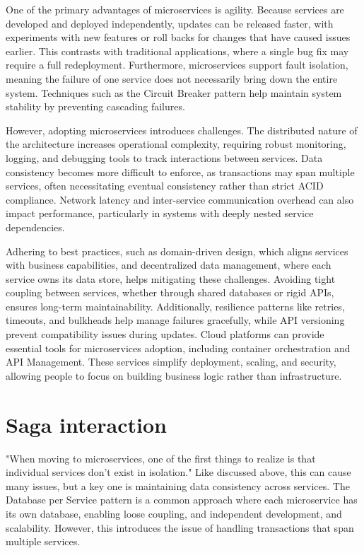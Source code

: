 \documentclass[]{final}
\begin{document}
One of the primary advantages of microservices is agility. Because services
are developed and deployed independently, updates can be released
faster, with experiments with new features or roll backs for changes that
have caused issues earlier.
This contrasts with traditional applications, where a single bug fix may
require a full redeployment. Furthermore, microservices support fault
isolation, meaning the failure of one service does not necessarily bring
down the entire system. Techniques such as the Circuit Breaker pattern
help maintain system stability by preventing cascading failures.

However, adopting microservices introduces challenges. The distributed nature
of the architecture increases operational complexity, requiring robust
monitoring, logging, and debugging tools to track interactions between
services. Data consistency becomes more difficult to enforce, as transactions
may span multiple services, often necessitating eventual consistency rather
than strict ACID compliance. Network latency and inter-service communication
overhead can also impact performance, particularly in systems with
deeply nested service dependencies.

Adhering to best practices, such as domain-driven design, which aligns services
with business capabilities, and decentralized data management, where each
service owns its data store, helps mitigating these challenges. Avoiding
tight coupling between services, whether through shared databases or rigid
APIs, ensures long-term maintainability. Additionally, resilience patterns
like retries, timeouts, and bulkheads help manage failures gracefully,
while API versioning prevent compatibility issues during updates.
Cloud platforms can provide essential tools for microservices adoption,
including container orchestration and API Management. These services simplify
deployment, scaling, and security, allowing people to focus on building
business logic rather than infrastructure.

\section{Saga interaction}

"When moving to microservices, one of the first things to
realize is that individual services don’t exist in isolation." %
Like discussed above, this can cause many issues, but a key one
is maintaining data
consistency across services. The Database per Service pattern is a common
approach where each microservice has its own database, enabling loose coupling,
and independent development, and scalability. However, this introduces the
issue of handling transactions that span multiple services.
\end{document}
